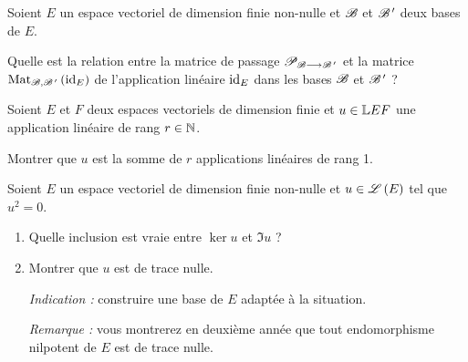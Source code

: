 \begin{corr}
\end{corr}

\begin{exo}[Exercice 4]
Soient \(E\) un espace vectoriel de dimension finie non-nulle et \(\mathscr{B}\) et \(\mathscr{B}^{\,\prime}\) deux bases de \(E\).

Quelle est la relation entre la matrice de passage \(\mathscr{P}_{\mathscr{B}\longrightarrow\mathscr{B}^{\,\prime}}\) et la matrice \(\Mat[\fami{B},\fami{B}\prim]{\id{E}}\) de l'application linéaire \(\mathrm{id}_{E}\) dans les bases \(\mathscr{B}\) et \(\mathscr{B}^{\,\prime}\) ?
\end{exo}

\begin{corr}
\end{corr}

\begin{exo}[Exercice 5]
Soient \(E\) et \(F\) deux espaces vectoriels de dimension finie et \(u\in\mathbb{L}{E}{F}\) une application linéaire de rang \(r\in\mathbb{N}\).

Montrer que \(u\) est la somme de \(r\) applications linéaires de rang 1.
\end{exo}

\begin{corr}
\end{corr}

\begin{exo}[Exercice 6]
Soient \(E\) un espace vectoriel de dimension finie non-nulle et \(u\in\mathscr{L}\left(E\right)\) tel que \(u^2=0\).

\begin{enumerate}
\item Quelle inclusion est vraie entre \(\ker u\) et \(\Im u\) ? \\

\item Montrer que \(u\) est de trace nulle.

\textit{Indication :} construire une base de \(E\) adaptée à la situation.

\textit{Remarque :} vous montrerez en deuxième année que tout endomorphisme nilpotent de \(E\) est de trace nulle.
\end{enumerate}
\end{exo}

\begin{corr}
\end{corr}

